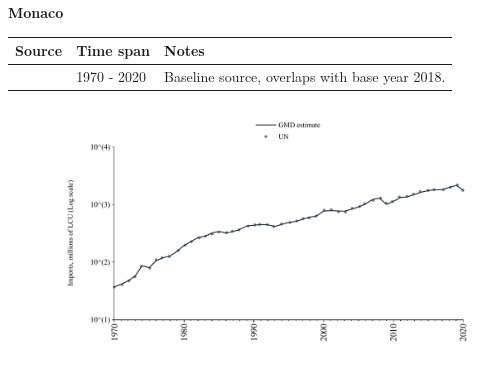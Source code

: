 \documentclass[12pt,a4paper,landscape]{article}
\begin{document}
\begin{adjustbox}{max totalsize={\paperwidth}{\paperheight},center}
\begin{minipage}[t][\textheight][t]{\textwidth}
\vspace*{0.5cm}
{}
\begin{center}
{\Large\bfseries Monaco}
\end{center}
\vspace{0.5cm}
\begin{table}[H]
\centering
\small
\begin{tabular}{|l|l|l|}
\hline
\textbf{Source} & \textbf{Time span} & \textbf{Notes} \\
\hline
\rowcolor{white}\cite{UN}& 1970 - 2020 &Baseline source, overlaps with base year 2018.\\
\hline
\end{tabular}
\end{table}
\begin{figure}[H]
\centering
\includegraphics[width=\textwidth,height=0.6\textheight,keepaspectratio]{graphs/MCO_imports.pdf}
\end{figure}
\end{minipage}
\end{adjustbox}
\end{document}
